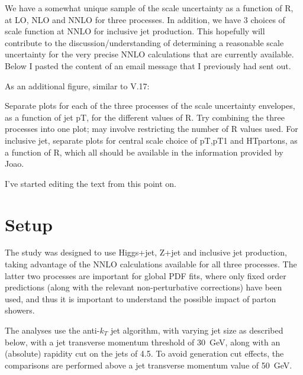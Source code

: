 \documentclass[aps,prd,onecolumn,fleqn,superscriptaddress,groupedaddress,nofootinbib,preprintnumbers,nobalancelastpage]{revtex4}
\begin{document}
We have a somewhat unique sample of the scale uncertainty as a function of R, at LO, NLO and NNLO for three processes. In addition, we have 3 choices of scale function at NNLO for inclusive jet production. This hopefully will contribute to the discussion/understanding of determining a reasonable scale uncertainty for the very precise NNLO calculations that are currently available. Below I pasted the content of an email message that I previously had sent out. 

As an additional figure, similar to V.17:

Separate plots for each of the three processes of  the scale uncertainty envelopes, as a function of jet pT, for the different values of R. Try combining the three processes into one plot; may involve restricting the number of R values used. For inclusive jet, separate plots for central scale choice of pT,pT1
and HTpartons, as a function of R, which all should be available in the information provided by Joao. 

I've started editing the text from this point on.  

\section{Setup}
 
The study was designed to use Higgs+jet, Z+jet and inclusive jet production,
taking advantage of the NNLO calculations available for all three processes.
The latter two processes are important for global PDF fits, where
only fixed order predictions (along with the relevant non-perturbative
corrections) have been used, and thus it is important to understand the possible impact of parton showers. 

The analyses use the anti-$k_T$ jet algorithm, with varying jet size as described
below, with a jet transverse momentum threshold of 30~GeV, along with an
(absolute) rapidity cut on the jets of 4.5. To avoid generation cut effects, the
comparisons are performed above a jet transverse momentum value of 50~GeV.
\end{document}
